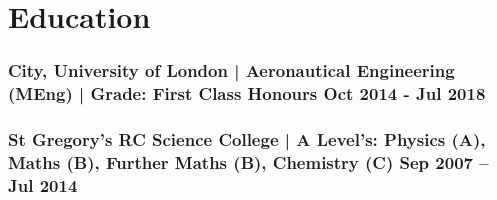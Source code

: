 \documentclass[a4paper, 9pt]{article}
\begin{document}
\section*{Education}
\vspace{-2.5mm}
\subsubsection*{\textbf {City, University of London | Aeronautical Engineering (MEng)} | Grade: First Class Honours   \hfill \textbf{Oct 2014 - Jul 2018}}\FloatBarrier

\vspace{-1mm}

\subsubsection*{\textbf{St Gregory’s RC Science College} | A Level's: Physics (A), Maths (B), Further Maths (B), Chemistry (C)  \hfill  \textbf{Sep 2007 – Jul 2014}}

\vspace{3.5mm}
{\titlerule[1.0pt]}

\date{}
\end{document}
